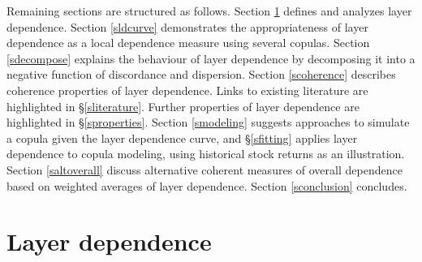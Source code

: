 \documentclass[authoryear]{elsarticle}
\newcommand{\sref}[1]{\S\ref{#1}}
\newcommand{\aref}[1]{\ref{#1}}
\begin{document}
Remaining sections are structured as follows. Section \aref{sintroduction} defines and analyzes layer dependence. Section \aref{sldcurve} demonstrates the appropriateness of layer dependence as a local dependence measure using several copulas. Section \aref{sdecompose} explains the behaviour of layer dependence by decomposing it into a negative function of discordance and dispersion. Section \aref{scoherence} describes coherence properties of layer dependence. Links to existing literature are highlighted in  \sref{sliterature}. Further properties of layer dependence are highlighted in  \sref{sproperties}. Section \aref{smodeling} suggests approaches to simulate a copula given the layer dependence curve, and  \sref{sfitting} applies layer dependence to copula modeling, using historical stock returns as an illustration. Section \aref{saltoverall} discuss alternative coherent measures of overall dependence based on weighted averages of layer dependence. Section \aref{sconclusion} concludes.

\section{Layer dependence}\label{sintroduction}
\end{document}
